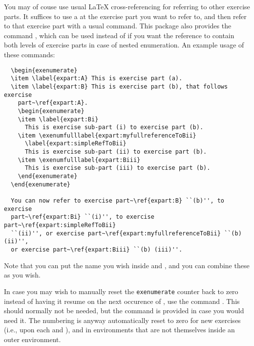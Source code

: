 \documentclass[11pt,a4paper]{article}
\begin{document}
You may of couse use usual \LaTeX{} cross-referencing for referring to other exercise
parts. It suffices to use a  at the exercise part you want to refer to, and
then refer to that exercise part with a usual  command. This package also
provides the command , which can be used instead of
 if you want the reference to contain both levels of exercise parts in case
of nested enumeration. An example usage of these commands:
\begin{pkgverbatim}
\begin{verbatim}
  \begin{exenumerate}
  \item \label{expart:A} This is exercise part (a).
  \item \label{expart:B} This is exercise part (b), that follows exercise
    part~\ref{expart:A}.
    \begin{exenumerate}
    \item \label{expart:Bi}
      This is exercise sub-part (i) to exercise part (b).
    \item \exenumfulllabel{expart:myfullreferenceToBii}
      \label{expart:simpleRefToBii}
      This is exercise sub-part (ii) to exercise part (b).
    \item \exenumfulllabel{expart:Biii}
      This is exercise sub-part (iii) to exercise part (b).
    \end{exenumerate}
  \end{exenumerate}

  You can now refer to exercise part~\ref{expart:B} ``(b)'', to exercise
  part~\ref{expart:Bi} ``(i)'', to exercise part~\ref{expart:simpleRefToBii}
  ``(ii)'', or exercise part~\ref{expart:myfullreferenceToBii} ``(b) (ii)'',
  or exercise part~\ref{expart:Biii} ``(b) (iii)''.

\end{verbatim}
\end{pkgverbatim}
Note that you can put the name you wish inside  and
, and you can combine these as you wish.


In case you may wish to manually reset the \texttt{exenumerate} counter back to zero
instead of having it resume on the next occurence of , use the
command . This 
should normally not be needed, but the command is provided in case you would need it. The
numbering is anyway automatically reset to zero for new exercises (i.e., upon each
 and ), and in  environments that are not
themselves inside an outer  environment. 
\end{document}
